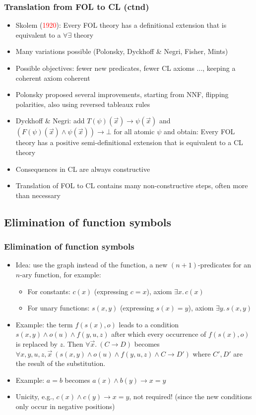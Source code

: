 \documentclass[handout,11pt]{beamer}
\newcommand{\red}[1]{\textcolor{red}{#1}}
\begin{document}
\begin{frame}
\frametitle{Translation from FOL to CL (ctnd)}
 \begin{itemize}[<+->]
   \item Skolem (\red{1920}): Every FOL theory has a definitional 
   extension that is equivalent to a $\forall\exists$ theory
   \item Many variations possible (Polonsky, Dyckhoff \& Negri, Fisher, Mints)
   \item Possible objectives: fewer new predicates, fewer CL axioms ...,
   keeping a coherent axiom coherent
   \item Polonsky proposed several improvements, starting from NNF,
   flipping polarities, also using reversed tableaux rules
   \item Dyckhoff \& Negri: add $T(\psi)(\vec{x}) \to \psi(\vec{x})$ 
   and $(F(\psi)(\vec{x})\wedge \psi(\vec{x})) \to \bot$
   for all atomic $\psi$ and obtain:
   Every FOL theory has a positive semi-definitional extension 
   that is equivalent to a CL theory
   \item Consequences in CL are always constructive
   \item Translation of FOL to CL contains many non-constructive steps,
   often more than necessary
 \end{itemize}
\end{frame}
 
\subsection{Elimination of function symbols}

\begin{frame}
\frametitle{Elimination of function symbols}
 \begin{itemize}[<+->]
  \item Idea: use the graph instead of the function,
  a new $(n{+}1)$-predicates for an $n$-ary function, for example:
   \begin{itemize}[<+->]
    \item For constants: $c(x)$ (expressing $c=x$), 
     axiom $\exists x.\,c(x)$
    \item For unary functions: 
    $s(x,y)$ (expressing $s(x)=y$), axiom $\exists y.\,s(x,y)$
   \end{itemize} 
   \item Example: the term $f(s(x),o)$ leads to a condition
   $s(x,y)\land o(u)\land f(y,u,z)$ after which every occurrence of
   $f(s(x),o)$ is replaced by $z$. Then $\forall\vec{x}.~(C \to D)$ becomes 
   $\forall x,y,u,z,\vec{x}~(s(x,y)\land o(u)\land f(y,u,z)\land C\to D')$ 
   where $C',D'$ are the result of the substitution.
   \item Example: $a=b$ becomes $a(x) \land b(y) \to x=y$   
   \item Unicity, e.g., $c(x)\land c(y)\to x=y$, \alert{not} required!
   (since the new conditions only occur in negative positions)
 \end{itemize}
\end{frame}
\end{document}
